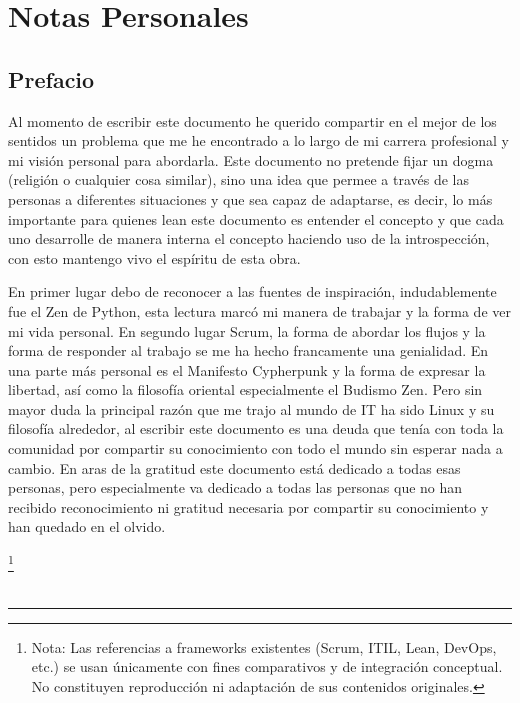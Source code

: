 \chapter{Notas Personales}\label{chap:ab}


\section{Prefacio}

Al momento de escribir este documento he querido compartir en el mejor de los sentidos un problema que me he 
encontrado a lo largo de mi carrera profesional y mi visión personal para abordarla. Este documento 
no pretende fijar un dogma (religión o cualquier cosa similar), sino una idea que permee a través de las 
personas a diferentes situaciones y que sea capaz de adaptarse, es decir, lo más importante para quienes 
lean este documento es entender el concepto y que cada uno desarrolle de manera interna el concepto haciendo 
uso de la introspección, con esto mantengo vivo el espíritu de esta obra.

En primer lugar debo de reconocer a las fuentes de inspiración, indudablemente fue el Zen de Python, 
esta lectura marcó mi manera de trabajar y la forma de ver mi vida personal. En segundo lugar Scrum, 
la forma de abordar los flujos y la forma de responder al trabajo se me ha hecho francamente una genialidad. 
En una parte más personal es el Manifesto Cypherpunk y la forma de expresar la libertad, así como la filosofía 
oriental especialmente el Budismo Zen. Pero sin mayor duda la principal razón que me trajo al mundo de 
IT ha sido Linux y su filosofía alrededor, al escribir este documento es una deuda que tenía con toda la 
comunidad por compartir su conocimiento con todo el mundo sin esperar nada a cambio. En aras de la gratitud 
este documento está dedicado a todas esas personas, pero especialmente va dedicado a todas las personas que 
no han recibido reconocimiento ni gratitud necesaria por compartir su conocimiento y han quedado en el olvido.

\footnote{Nota: Las referencias a frameworks existentes (Scrum, ITIL, Lean, DevOps, etc.) se usan únicamente con fines comparativos y de integración conceptual. No constituyen reproducción ni adaptación de sus contenidos originales.}
\\ 
\\
\hrule
